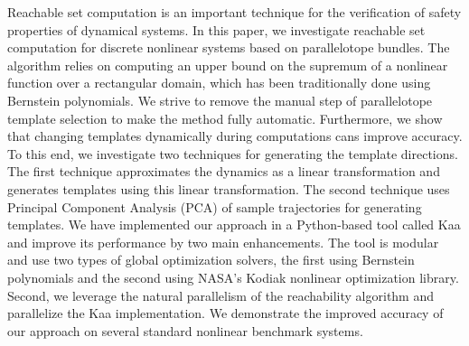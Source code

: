 Reachable set computation is an important technique for the verification of safety properties of dynamical systems.
%
%
In this paper, we investigate reachable set computation for discrete nonlinear systems based on parallelotope bundles.
%
The algorithm relies on computing an upper bound on the supremum of a nonlinear function over a rectangular domain, which has been traditionally done using Bernstein polynomials.
 We strive to remove the manual step of parallelotope template selection to make the method fully automatic.
%
Furthermore, we show that changing templates dynamically during computations cans improve accuracy.
%
%
%
To this end, we investigate two techniques for generating the template directions.
%
The first technique approximates the dynamics as a linear transformation and generates templates using this linear transformation.
%
The second technique uses Principal Component Analysis (PCA) of sample trajectories for generating templates.
%
We have implemented our approach in a Python-based tool called Kaa and improve its performance by two main enhancements.
%
%
The tool is modular and use two types of global optimization solvers, the first using Bernstein polynomials and the second using NASA's Kodiak nonlinear optimization library.
%
Second, we leverage the natural parallelism of the reachability algorithm and parallelize the Kaa implementation.
%
We demonstrate the improved accuracy of our approach on several standard nonlinear benchmark systems.
%
%
